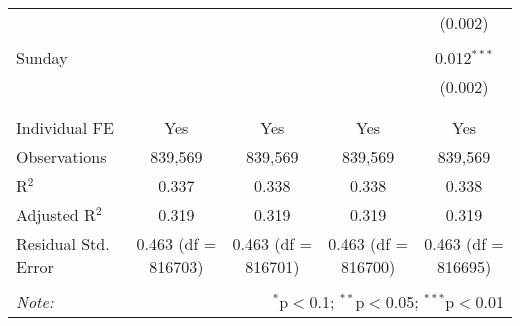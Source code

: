 \documentclass[
]{article}
\begin{document}
\begin{table}[!htbp]
{\begin{tabular}{@{\extracolsep{5pt}}lcccc}
  &  &  &  & (0.002) \\ 
  & & & & \\ 
 Sunday &  &  &  & 0.012$^{***}$ \\ 
  &  &  &  & (0.002) \\ 
  & & & & \\ 
\hline \\[-1.8ex] 
Individual FE & Yes & Yes & Yes & Yes \\ 
Observations & 839,569 & 839,569 & 839,569 & 839,569 \\ 
R$^{2}$ & 0.337 & 0.338 & 0.338 & 0.338 \\ 
Adjusted R$^{2}$ & 0.319 & 0.319 & 0.319 & 0.319 \\ 
Residual Std. Error & 0.463 (df = 816703) & 0.463 (df = 816701) & 0.463 (df = 816700) & 0.463 (df = 816695) \\ 
\hline 
\hline \\[-1.8ex] 
\textit{Note:}  & \multicolumn{4}{r}{$^{*}$p$<$0.1; $^{**}$p$<$0.05; $^{***}$p$<$0.01} \\ 
\end{tabular}
} 
\end{table} 
\newpage
\end{document}
